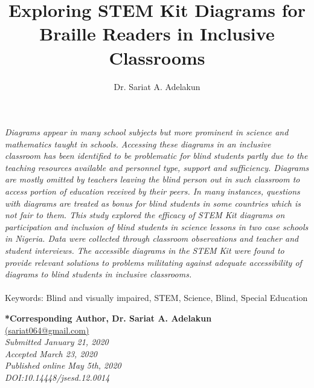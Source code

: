 \documentclass[11.5pt]{sig-alternate} %
\makeatletter
\let\oldabstract\abstract
\let\oldendabstract\endabstract
\renewenvironment{abstract}
{\renewenvironment{quotation}%
               {\list{}{\addtolength{\leftmargin}{1em} %
                        \listparindent 1.5em%
                        \itemindent    \listparindent%
                        \rightmargin   \leftmargin%
                        \parsep        \z@ \@plus\p@}%
                \item\relax}%
               {\endlist}%
\oldabstract}
{\oldendabstract}
\makeatother
\begin{document}
\title{Exploring STEM Kit Diagrams for Braille Readers in Inclusive Classrooms}

\author[1]{\large \color{blue}Dr. Sariat A. Adelakun}


\toappear{}
\maketitle
\begin{@twocolumnfalse} 
\begin{abstract}
\item 
\textit {Diagrams appear in many school subjects but more prominent in science and mathematics taught in schools. Accessing these diagrams in an inclusive classroom has been identified to be problematic for blind students partly due to the teaching resources available and personnel type, support and sufficiency. Diagrams are mostly omitted by teachers leaving the blind person out in such classroom to access portion of education received by their peers. In many instances, questions with diagrams are treated as bonus for blind students in some countries which is not fair to them. This study explored the efficacy of STEM Kit\textcopyright{} diagrams on participation and inclusion of blind students in science lessons in two case schools in Nigeria. Data were collected through classroom observations and teacher and student interviews. The accessible diagrams in the STEM Kit\textcopyright{} were found to provide relevant solutions to problems militating against adequate accessibility of diagrams to blind students in inclusive classrooms.}
\\ \\
Keywords: Blind and visually impaired, STEM, Science, Blind, Special Education
\end{abstract}
\end{@twocolumnfalse}


\textbf{*Corresponding Author, Dr. Sariat A. Adelakun}\\
\href{mailto: sariat064@gmail.com }{(sariat064@gmail.com)} \\
\textit{Submitted  January 21, 2020}\\
\textit{Accepted March 23, 2020} \\
\textit{Published online May 5th, 2020} \\
\textit{DOI:10.14448/jsesd.12.0014} \\
\pagebreak
\clearpage
\end{document}
